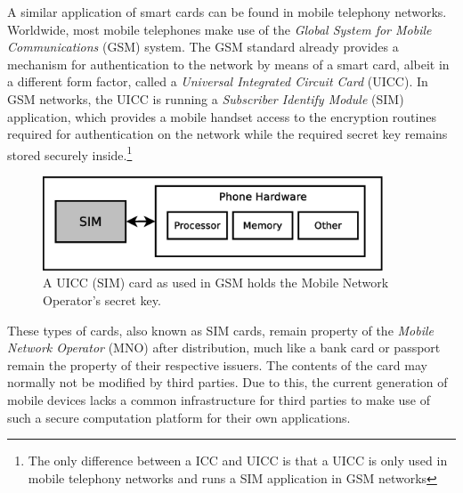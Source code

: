 A similar application of smart cards can be found in mobile telephony networks.
Worldwide, most mobile telephones make use of the \textit{Global System for Mobile Communications} (GSM) system.
The GSM standard already provides a mechanism for authentication to the network by means of a smart card, albeit in a different form factor, called a \textit{Universal Integrated Circuit Card} (UICC).
In GSM networks, the UICC is running a \textit{Subscriber Identify Module} (SIM) application, which provides a mobile handset access to the encryption routines required for authentication on the network while the required secret key remains stored securely inside.\footnote{The only difference between a ICC and UICC is that a UICC is only used in mobile telephony networks and runs a SIM application in GSM networks}

\begin{figure}
\includegraphics[width=0.9\textwidth]{images/SIM_in_GSM}
\caption[UICC running SIM application in GSM]
{
A UICC (SIM) card as used in GSM holds the Mobile Network Operator's secret key.
}
\label{fig:gsm_sim}
\end{figure}

These types of cards, also known as SIM cards, remain property of the \textit{Mobile Network Operator} (MNO) after distribution, much like a bank card or passport remain the property of their respective issuers. %
The contents of the card may normally not be modified by third parties.
Due to this, the current generation of mobile devices lacks a common infrastructure for third parties to make use of such a secure computation platform for their own applications.



